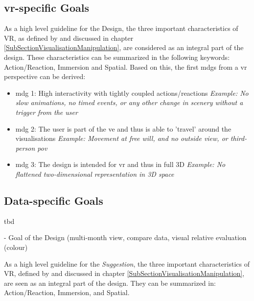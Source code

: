 \subsection{\gls{vr}-specific Goals}

As a high level guideline for the Design, the three important characteristics of VR, as defined by \cite{Stone1994} and discussed in chapter \ref{SubSectionVisualisationManipulation}, are considered as an integral part of the design. These characteristics can be summarized in the following keywords: Action/Reaction, Immersion and Spatial. Based on this, the first \glspl{mdg} from a \gls{vr} perspective can be derived:
\begin{itemize}[noitemsep,nolistsep]
	\item \gls{mdg} 1: High interactivity with tightly coupled actions/reactions \newline
		\textit{Example: No slow animations, no timed events, or any other change in scenery without a trigger from the user}
	\item \gls{mdg} 2: The user is part of the \gls{ve} and thus is able to 'travel' around the visualisations \newline
		\textit{Example: Movement at free will, and no outside view, or third-person \gls{pov}}
	\item \gls{mdg} 3: The design is intended for \gls{vr} and thus in full 3D \newline
		\textit{Example: No flattened two-dimensional representation in 3D space}
\end{itemize}





\subsection{Data-specific Goals}

tbd

- Goal of the Design (multi-month view, compare data, visual relative evaluation (colour)

As a high level guideline for the \textit{Suggestion}, the three important characteristics of VR, defined by \cite{Stone1994} and discussed in chapter \ref{SubSectionVisualisationManipulation}, are seen as an integral part of the design. They can be summarized in: Action/Reaction, Immersion, and Spatial. \newline





